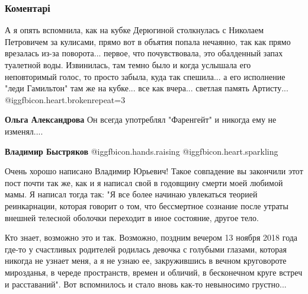  
 
 
 
 
\subsubsection{Коментарі}
\label{sec:27_10_2020.fb.bystrjakov_vladimir.1.pamjat_karachencov.cmt}

\begin{itemize} %

А я опять вспомнила, как на кубке Дерюгиной столкнулась с Николаем Петровичем за
кулисами, прямо вот в объятия попала нечаянно, так как прямо врезалась из-за
поворота... первое, что почувствовала, это обалденный запах туалетной
воды. Извинилась, там темно было и когда услышала его неповторимый голос, то
просто забыла, куда так спешила... а его исполнение "леди Гамильтон" там же на
кубке... все как вчера... светлая память Артисту... @igg{fbicon.heart.broken}{repeat=3} 

\begin{itemize} %
\textbf{Ольга Александрова} Он всегда употреблял "Фаренгейт" и никогда ему не изменял....

\textbf{Владимир Быстряков}  @igg{fbicon.hands.raising}  @igg{fbicon.heart.sparkling} 
\end{itemize} %


Очень хорошо написано Владимир Юрьевич! Такое совпадение вы закончили этот пост
почти так же, как и я написал свой в годовщину смерти моей любимой мамы. Я
написал тогда так: "Я все более начинаю увлекаться теорией реинкарнации,
которая говорит о том, что бессмертное сознание после утраты внешней телесной
оболочки переходит в иное состояние, другое тело.

Кто знает, возможно это и так. Возможно, поздним вечером 13 ноября 2018 года
где-то у счастливых родителей родилась девочка с голубыми глазами, которая
никогда не узнает меня, а я не узнаю ее, закружившись в вечном круговороте
мирозданья, в череде пространств, времен и обличий, в бесконечном круге встреч
и расставаний". Вот вспомнилось и стало вновь как-то невыносимо грустно...


\end{itemize}
